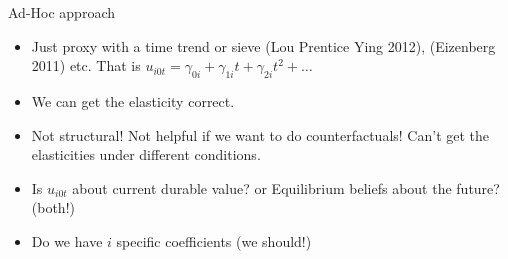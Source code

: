 \begin{frame}{Ad-Hoc approach}
\begin{itemize}
\item  Just proxy with a time trend or sieve (Lou Prentice Ying 2012), (Eizenberg 2011) etc.  That is $u_{i0t} = \gamma_{0i} + \gamma_{1i} t + \gamma_{2i} t^2 + \ldots$
\item We can get the elasticity correct.
\item Not structural! Not helpful if we want to do counterfactuals! Can't get the elasticities under different conditions.
\item Is $u_{i0t}$ about current durable value? or Equilibrium beliefs about the future? (both!)
\item Do we have $i$ specific coefficients (we should!)
\end{itemize}
\end{frame}

